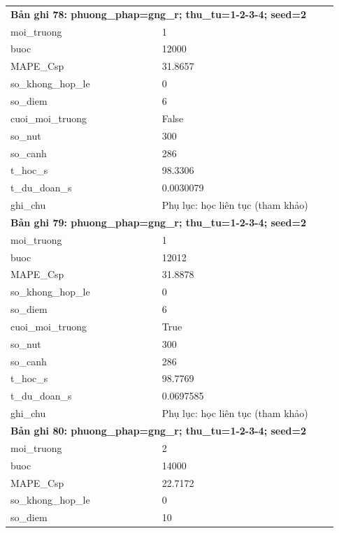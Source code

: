\begin{longtable}{p{0.43\linewidth}p{0.50\linewidth}}
\midrule
\multicolumn{2}{p{0.95\linewidth}}{\textbf{Bản ghi 78: phuong\_phap=gng\_r; thu\_tu=1-2-3-4; seed=2}} \\
moi\_\allowbreak truong & 1 \\
buoc & 12000 \\
MAPE\_\allowbreak Csp & 31.8657 \\
so\_\allowbreak khong\_\allowbreak hop\_\allowbreak le & 0 \\
so\_\allowbreak diem & 6 \\
cuoi\_\allowbreak moi\_\allowbreak truong & False \\
so\_\allowbreak nut & 300 \\
so\_\allowbreak canh & 286 \\
t\_\allowbreak hoc\_\allowbreak s & 98.3306 \\
t\_\allowbreak du\_\allowbreak doan\_\allowbreak s & 0.0030079 \\
ghi\_\allowbreak chu & Phụ lục: học liên tục (tham khảo) \\
\midrule
\multicolumn{2}{p{0.95\linewidth}}{\textbf{Bản ghi 79: phuong\_phap=gng\_r; thu\_tu=1-2-3-4; seed=2}} \\
moi\_\allowbreak truong & 1 \\
buoc & 12012 \\
MAPE\_\allowbreak Csp & 31.8878 \\
so\_\allowbreak khong\_\allowbreak hop\_\allowbreak le & 0 \\
so\_\allowbreak diem & 6 \\
cuoi\_\allowbreak moi\_\allowbreak truong & True \\
so\_\allowbreak nut & 300 \\
so\_\allowbreak canh & 286 \\
t\_\allowbreak hoc\_\allowbreak s & 98.7769 \\
t\_\allowbreak du\_\allowbreak doan\_\allowbreak s & 0.0697585 \\
ghi\_\allowbreak chu & Phụ lục: học liên tục (tham khảo) \\
\midrule
\multicolumn{2}{p{0.95\linewidth}}{\textbf{Bản ghi 80: phuong\_phap=gng\_r; thu\_tu=1-2-3-4; seed=2}} \\
moi\_\allowbreak truong & 2 \\
buoc & 14000 \\
MAPE\_\allowbreak Csp & 22.7172 \\
so\_\allowbreak khong\_\allowbreak hop\_\allowbreak le & 0 \\
so\_\allowbreak diem & 10 \\

\end{longtable}
